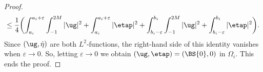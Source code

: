 \begin{proof}
\begin{multline}
\leq \frac{1}{4}\biggl(\int_{a_i}^{a_i+\varepsilon} \int_{-1}^{2M} \vert\ug\vert^{2}+\int_{a_i}^{a_i+\varepsilon}\vert\etap\vert^{2}
+\int_{b_i-\varepsilon}^{b_i} \int_{-1}^{2M} \vert\ug\vert^{2}+\int_{b_i-\varepsilon}^{b_i}\vert\etap\vert^{2} \biggr).
\end{multline}
Since $(\ug,\dot{\eta})$ are both $L^2$-functions, the right-hand side of this identity vanishes when $\varepsilon \to 0$. So, letting $\varepsilon\to 0$ we obtain $(\ug,\etap)=(\BS{0},0)$ in $\Omega_i$. This ends the proof.
\end{proof}
